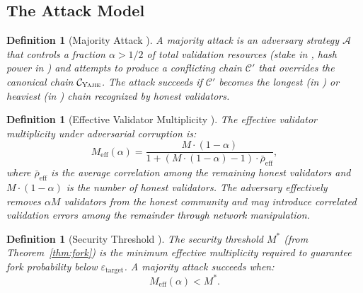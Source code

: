 \documentclass[11pt,a4paper]{article}
\newtheorem{definition}[theorem]{Definition}
\theoremstyle{definition}
\newcommand{\Yajie}{\textsc{Yajie}}
\newcommand{\mthreshold}{M^{*}}
\newcommand{\PoW}{\mathrm{PoW}}
\newcommand{\PoS}{\mathrm{PoS}}
\begin{document}
\subsection{The Attack Model}
\begin{definition}[Majority Attack ]
\label{def:majority_attack}
A majority attack is an adversary strategy $\mathcal{A}$ that controls a fraction $\alpha > 1/2$ of total validation resources (stake in \PoS{}, hash power in \PoW{}) and attempts to produce a conflicting chain $\mathcal{C}'$ that overrides the canonical chain $\mathcal{C}_{\Yajie}$. The attack succeeds if $\mathcal{C}'$ becomes the longest (in \PoW{}) or heaviest (in \PoS{}) chain recognized by honest validators.
\end{definition}
\begin{definition}[Effective Validator Multiplicity ]
\label{def:meff}
The effective validator multiplicity under adversarial corruption is:
\begin{equation}
    M_{\mathrm{eff}}(\alpha) = \frac{M \cdot (1 - \alpha)}{1 + (M \cdot (1 - \alpha) - 1) \cdot \bar{\rho}_{\mathrm{eff}}},
    \label{eq:meff_attack}
\end{equation}
where $\bar{\rho}_{\mathrm{eff}}$ is the average correlation among the remaining honest validators and $M \cdot (1 - \alpha)$ is the number of honest validators. The adversary effectively \textit{removes} $\alpha M$ validators from the honest community and may introduce correlated validation errors among the remainder through network manipulation.
\end{definition}
\begin{definition}[Security Threshold ]
\label{def:security_threshold}
The security threshold $\mthreshold$ (from Theorem~\ref{thm:fork}) is the minimum effective multiplicity required to guarantee fork probability below $\varepsilon_{\mathrm{target}}$. A majority attack succeeds when:
\begin{equation}
    M_{\mathrm{eff}}(\alpha) < \mthreshold.
    \label{eq:threshold_breach}
\end{equation}
\end{definition}
\end{document}
